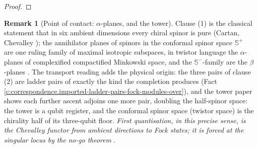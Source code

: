 \documentclass[11pt]{article}
\theoremstyle{definition}
\newtheorem{remark}[theorem]{Remark}
\theoremstyle{plain}
\newcommand{\changedmark}[2]{\marginpar{\raggedright\scriptsize\color{#1}#2}}
\providecommand{\CS}{}\renewcommand{\CS}{{\mathbb{S}^{+}}}
\providecommand{\CSm}{}\renewcommand{\CSm}{{\mathbb{S}^{-}}}
\begin{document}
\begin{proof}
\end{proof}

\begin{remark}[Point of contact: $\alpha$-planes, and the tower]\label{c:note.correspondence.point-contact-planes-tower}
\changedmark{gray}{reworded}
Clause (1) is the classical statement that in six ambient dimensions every chiral spinor is pure (Cartan, Chevalley \cite{Chevalley54}); the annihilator planes of spinors in the conformal spinor space $\CS$ are one ruling family of maximal isotropic subspaces, in twistor language the $\alpha$-planes of complexified compactified Minkowski space, and the $\CSm$-family are the $\beta$-planes \cite{Penrose1967, PenroseRindler86}. The transport reading adds the physical origin: the three pairs of clause (2) are ladder pairs of exactly the kind the completion produces (Fact \ref{c:correspondence.imported-ladder-pairs-fock-modules-over}), and the tower paper \cite[\S 4]{ButlerT3} shows each further ascent adjoins one more pair, doubling the half-spinor space: the tower is a qubit register, and the conformal spinor space (twistor space) is the chirality half of its three-qubit floor. \emph{First quantisation, in this precise sense, is the Chevalley functor from ambient directions to Fock states; it is forced at the singular locus by the no-go theorem} \cite[Thm.~4.2]{ButlerT1}.
\end{remark}
\end{document}
